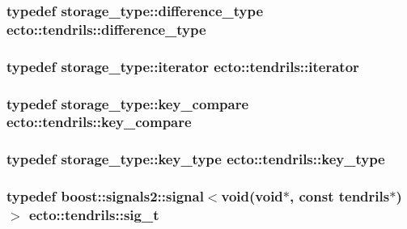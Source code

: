 \subsubsection[{\texorpdfstring{difference\+\_\+type}{difference_type}}]{\setlength{\rightskip}{0pt plus 5cm}typedef storage\+\_\+type\+::difference\+\_\+type {\bf ecto\+::tendrils\+::difference\+\_\+type}}\hypertarget{classecto_1_1tendrils_a919b9a4666ad641148b6a432a1fd08fb}{}\label{classecto_1_1tendrils_a919b9a4666ad641148b6a432a1fd08fb}
\subsubsection[{\texorpdfstring{iterator}{iterator}}]{\setlength{\rightskip}{0pt plus 5cm}typedef storage\+\_\+type\+::iterator {\bf ecto\+::tendrils\+::iterator}}\hypertarget{classecto_1_1tendrils_a6f0b7bd6e3a03f047351303630b889e0}{}\label{classecto_1_1tendrils_a6f0b7bd6e3a03f047351303630b889e0}
\subsubsection[{\texorpdfstring{key\+\_\+compare}{key_compare}}]{\setlength{\rightskip}{0pt plus 5cm}typedef storage\+\_\+type\+::key\+\_\+compare {\bf ecto\+::tendrils\+::key\+\_\+compare}}\hypertarget{classecto_1_1tendrils_aa347bebda44153437e8554a25bed9e6b}{}\label{classecto_1_1tendrils_aa347bebda44153437e8554a25bed9e6b}
\subsubsection[{\texorpdfstring{key\+\_\+type}{key_type}}]{\setlength{\rightskip}{0pt plus 5cm}typedef storage\+\_\+type\+::key\+\_\+type {\bf ecto\+::tendrils\+::key\+\_\+type}}\hypertarget{classecto_1_1tendrils_aa6165c6ab72d93cd56796ea81e450245}{}\label{classecto_1_1tendrils_aa6165c6ab72d93cd56796ea81e450245}
\subsubsection[{\texorpdfstring{sig\+\_\+t}{sig_t}}]{\setlength{\rightskip}{0pt plus 5cm}typedef boost\+::signals2\+::signal$<$void(void$\ast$, const {\bf tendrils}$\ast$)$>$ {\bf ecto\+::tendrils\+::sig\+\_\+t}\hspace{0.3cm}{\ttfamily [private]}}\hypertarget{classecto_1_1tendrils_aca7990b4d8ccfbddfb4d5c805345ca23}{}\label{classecto_1_1tendrils_aca7990b4d8ccfbddfb4d5c805345ca23}
